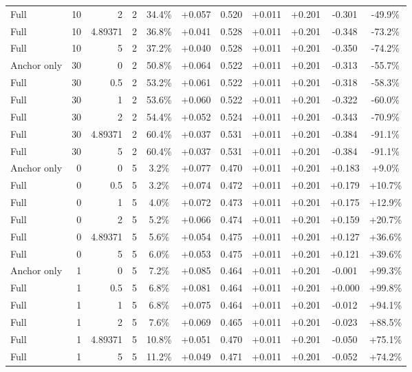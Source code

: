 \begin{table}[htbp]
\begin{tabular}{lrrrccccccc}
Full & 10 & 2 & 2 & 34.4\% & +0.057 & 0.520 & +0.011 & +0.201 & -0.301 & -49.9\% \\
Full & 10 & 4.89371 & 2 & 36.8\% & +0.041 & 0.528 & +0.011 & +0.201 & -0.348 & -73.2\% \\
Full & 10 & 5 & 2 & 37.2\% & +0.040 & 0.528 & +0.011 & +0.201 & -0.350 & -74.2\% \\
Anchor only & 30 & 0 & 2 & 50.8\% & +0.064 & 0.522 & +0.011 & +0.201 & -0.313 & -55.7\% \\
Full & 30 & 0.5 & 2 & 53.2\% & +0.061 & 0.522 & +0.011 & +0.201 & -0.318 & -58.3\% \\
Full & 30 & 1 & 2 & 53.6\% & +0.060 & 0.522 & +0.011 & +0.201 & -0.322 & -60.0\% \\
Full & 30 & 2 & 2 & 54.4\% & +0.052 & 0.524 & +0.011 & +0.201 & -0.343 & -70.9\% \\
Full & 30 & 4.89371 & 2 & 60.4\% & +0.037 & 0.531 & +0.011 & +0.201 & -0.384 & -91.1\% \\
Full & 30 & 5 & 2 & 60.4\% & +0.037 & 0.531 & +0.011 & +0.201 & -0.384 & -91.1\% \\
Anchor only & 0 & 0 & 5 & 3.2\% & +0.077 & 0.470 & +0.011 & +0.201 & +0.183 & +9.0\% \\
Full & 0 & 0.5 & 5 & 3.2\% & +0.074 & 0.472 & +0.011 & +0.201 & +0.179 & +10.7\% \\
Full & 0 & 1 & 5 & 4.0\% & +0.072 & 0.473 & +0.011 & +0.201 & +0.175 & +12.9\% \\
Full & 0 & 2 & 5 & 5.2\% & +0.066 & 0.474 & +0.011 & +0.201 & +0.159 & +20.7\% \\
Full & 0 & 4.89371 & 5 & 5.6\% & +0.054 & 0.475 & +0.011 & +0.201 & +0.127 & +36.6\% \\
Full & 0 & 5 & 5 & 6.0\% & +0.053 & 0.475 & +0.011 & +0.201 & +0.121 & +39.6\% \\
Anchor only & 1 & 0 & 5 & 7.2\% & +0.085 & 0.464 & +0.011 & +0.201 & -0.001 & +99.3\% \\
Full & 1 & 0.5 & 5 & 6.8\% & +0.081 & 0.464 & +0.011 & +0.201 & +0.000 & +99.8\% \\
Full & 1 & 1 & 5 & 6.8\% & +0.075 & 0.464 & +0.011 & +0.201 & -0.012 & +94.1\% \\
Full & 1 & 2 & 5 & 7.6\% & +0.069 & 0.465 & +0.011 & +0.201 & -0.023 & +88.5\% \\
Full & 1 & 4.89371 & 5 & 10.8\% & +0.051 & 0.470 & +0.011 & +0.201 & -0.050 & +75.1\% \\
Full & 1 & 5 & 5 & 11.2\% & +0.049 & 0.471 & +0.011 & +0.201 & -0.052 & +74.2\% \\

\end{tabular}
\end{table}
